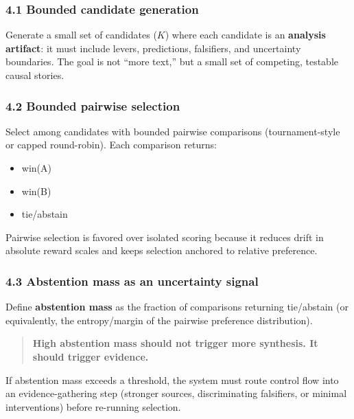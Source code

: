 \documentclass[11pt]{article}
\providecommand{\tightlist}{%
  \setlength{\itemsep}{0pt}\setlength{\parskip}{0pt}}
\begin{document}
\hypertarget{bounded-generation}{%
\subsubsection{4.1 Bounded candidate generation}\label{bounded-generation}}

Generate a small set of candidates ($K$) where each candidate is an \textbf{analysis artifact}: it must include levers, predictions, falsifiers, and uncertainty boundaries. The goal is not ``more text,'' but a small set of competing, testable causal stories.

\hypertarget{bounded-selection}{%
\subsubsection{4.2 Bounded pairwise selection}\label{bounded-selection}}

Select among candidates with bounded pairwise comparisons (tournament-style or capped round-robin). Each comparison returns:

\begin{itemize}
\tightlist
\item win(A)
\item win(B)
\item tie/abstain
\end{itemize}

Pairwise selection is favored over isolated scoring because it reduces drift in absolute reward scales and keeps selection anchored to relative preference.

\hypertarget{abstention-mass}{%
\subsubsection{4.3 Abstention mass as an uncertainty signal}\label{abstention-mass}}

Define \textbf{abstention mass} as the fraction of comparisons returning tie/abstain (or equivalently, the entropy/margin of the pairwise preference distribution).

\begin{quote}
\textbf{High abstention mass should not trigger more synthesis. It should trigger evidence.}
\end{quote}

If abstention mass exceeds a threshold, the system must route control flow into an evidence-gathering step (stronger sources, discriminating falsifiers, or minimal interventions) before re-running selection.
\end{document}
